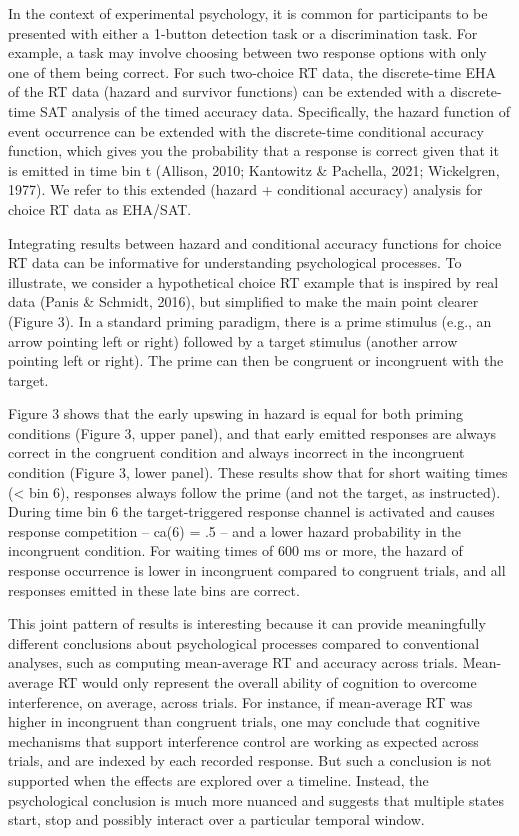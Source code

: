 \documentclass[
  man, donotrepeattitle,floatsintext]{apa6}
\begin{document}
In the context of experimental psychology, it is common for participants to be presented with either a 1-button detection task or a discrimination task. For example, a task may involve choosing between two response options with only one of them being correct. For such two-choice RT data, the discrete-time EHA of the RT data (hazard and survivor functions) can be extended with a discrete-time SAT analysis of the timed accuracy data. Specifically, the hazard function of event occurrence can be extended with the discrete-time conditional accuracy function, which gives you the probability that a response is correct given that it is emitted in time bin t (Allison, 2010; Kantowitz \& Pachella, 2021; Wickelgren, 1977). We refer to this extended (hazard + conditional accuracy) analysis for choice RT data as EHA/SAT.

Integrating results between hazard and conditional accuracy functions for choice RT data can be informative for understanding psychological processes. To illustrate, we consider a hypothetical choice RT example that is inspired by real data (Panis \& Schmidt, 2016), but simplified to make the main point clearer (Figure 3). In a standard priming paradigm, there is a prime stimulus (e.g., an arrow pointing left or right) followed by a target stimulus (another arrow pointing left or right). The prime can then be congruent or incongruent with the target.

Figure 3 shows that the early upswing in hazard is equal for both priming conditions (Figure 3, upper panel), and that early emitted responses are always correct in the congruent condition and always incorrect in the incongruent condition (Figure 3, lower panel). These results show that for short waiting times (\textless{} bin 6), responses always follow the prime (and not the target, as instructed). During time bin 6 the target-triggered response channel is activated and causes response competition -- ca(6) = .5 -- and a lower hazard probability in the incongruent condition. For waiting times of 600 ms or more, the hazard of response occurrence is lower in incongruent compared to congruent trials, and all responses emitted in these late bins are correct.

This joint pattern of results is interesting because it can provide meaningfully different conclusions about psychological processes compared to conventional analyses, such as computing mean-average RT and accuracy across trials. Mean-average RT would only represent the overall ability of cognition to overcome interference, on average, across trials. For instance, if mean-average RT was higher in incongruent than congruent trials, one may conclude that cognitive mechanisms that support interference control are working as expected across trials, and are indexed by each recorded response. But such a conclusion is not supported when the effects are explored over a timeline. Instead, the psychological conclusion is much more nuanced and suggests that multiple states start, stop and possibly interact over a particular temporal window.
\end{document}

